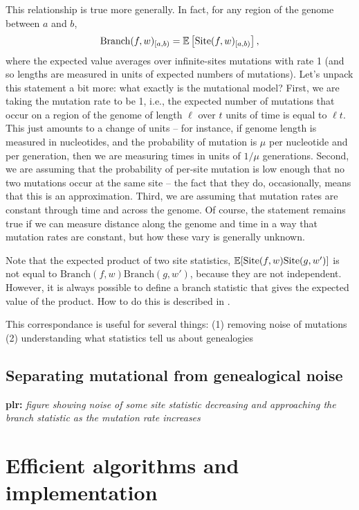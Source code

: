 \documentclass{article}
\newcommand{\branch}{\mbox{Branch}} %
\newcommand{\site}{\mbox{Site}} %
\newcommand{\iw}{w} %
\newcommand{\plr}[1]{{\color{blue}\textbf{plr:} \it #1}}
\begin{document}
This relationship is true more generally.
In fact, for any region of the genome between $a$ and $b$,
\begin{align}
    \branch(f, \iw)_{[a,b)}
    =
    \E\left[ \site(f, \iw)_{[a,b)} \right] ,
\end{align}
where the expected value averages over infinite-sites mutations with rate 1
(and so lengths are measured in units of expected numbers of mutations).
Let's unpack this statement a bit more: what exactly is the mutational model?
First, we are taking the mutation rate to be 1, i.e.,
the expected number of mutations that occur on a region of the genome of length $\ell$
over $t$ units of time is equal to $\ell t$.
This just amounts to a change of units --
for instance, if genome length is measured in nucleotides,
and the probability of mutation is $\mu$ per nucleotide and per generation,
then we are measuring times in units of $1/\mu$ generations.
Second, we are assuming that the probability of per-site mutation is low enough
that no two mutations occur at the same site
-- the fact that they do, occasionally, means that this is an approximation.
Third, we are assuming that mutation rates are constant through time and across the genome.
Of course, the statement remains true if we can measure distance along the genome and time 
in a way that mutation rates are constant, but how these vary is generally unknown.

Note that the expected product of two site statistics,
$\E[\site(f, \iw) \site(g, \iw')]$
is not equal to $\branch(f, \iw) \branch(g, \iw')$,
because they are not independent.
However, it is always possible to define a branch statistic that 
gives the expected value of the product.
How to do this is described in \citet{ralph2019empirical}.

This correspondance is useful for several things:
(1) removing noise of mutations
(2) understanding what statistics tell us about genealogies


\subsection*{Separating mutational from genealogical noise}

\plr{figure showing noise of some site statistic decreasing and approaching the branch statistic
    as the mutation rate increases}


\section*{Efficient algorithms and implementation}
\end{document}
